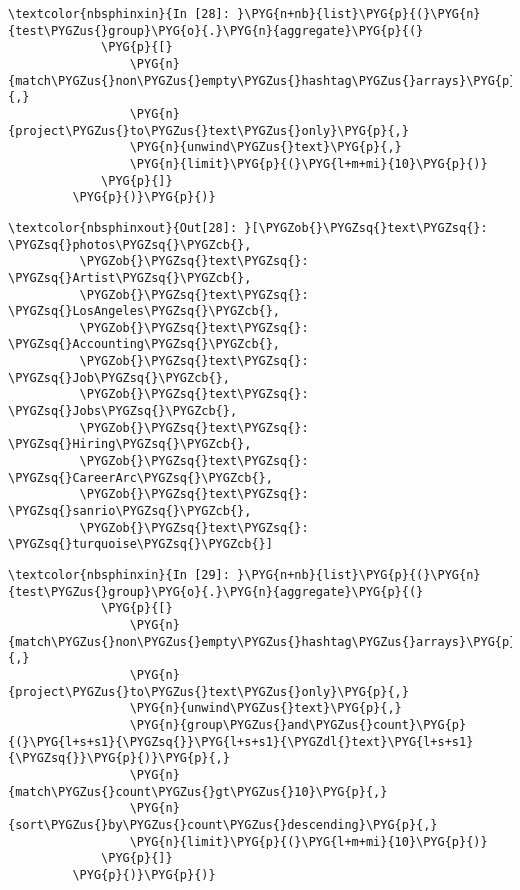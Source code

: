 \documentclass[letterpaper,10pt,english]{sphinxmanual}
\begin{document}
%
\begin{Verbatim}[commandchars=\\\{\}]
\textcolor{nbsphinxin}{In [28]: }\PYG{n+nb}{list}\PYG{p}{(}\PYG{n}{test\PYGZus{}group}\PYG{o}{.}\PYG{n}{aggregate}\PYG{p}{(}
             \PYG{p}{[}
                 \PYG{n}{match\PYGZus{}non\PYGZus{}empty\PYGZus{}hashtag\PYGZus{}arrays}\PYG{p}{,}
                 \PYG{n}{project\PYGZus{}to\PYGZus{}text\PYGZus{}only}\PYG{p}{,}
                 \PYG{n}{unwind\PYGZus{}text}\PYG{p}{,}
                 \PYG{n}{limit}\PYG{p}{(}\PYG{l+m+mi}{10}\PYG{p}{)}
             \PYG{p}{]}
         \PYG{p}{)}\PYG{p}{)}
\end{Verbatim}

%
\begin{Verbatim}[commandchars=\\\{\}]
\textcolor{nbsphinxout}{Out[28]: }[\PYGZob{}\PYGZsq{}text\PYGZsq{}: \PYGZsq{}photos\PYGZsq{}\PYGZcb{},
          \PYGZob{}\PYGZsq{}text\PYGZsq{}: \PYGZsq{}Artist\PYGZsq{}\PYGZcb{},
          \PYGZob{}\PYGZsq{}text\PYGZsq{}: \PYGZsq{}LosAngeles\PYGZsq{}\PYGZcb{},
          \PYGZob{}\PYGZsq{}text\PYGZsq{}: \PYGZsq{}Accounting\PYGZsq{}\PYGZcb{},
          \PYGZob{}\PYGZsq{}text\PYGZsq{}: \PYGZsq{}Job\PYGZsq{}\PYGZcb{},
          \PYGZob{}\PYGZsq{}text\PYGZsq{}: \PYGZsq{}Jobs\PYGZsq{}\PYGZcb{},
          \PYGZob{}\PYGZsq{}text\PYGZsq{}: \PYGZsq{}Hiring\PYGZsq{}\PYGZcb{},
          \PYGZob{}\PYGZsq{}text\PYGZsq{}: \PYGZsq{}CareerArc\PYGZsq{}\PYGZcb{},
          \PYGZob{}\PYGZsq{}text\PYGZsq{}: \PYGZsq{}sanrio\PYGZsq{}\PYGZcb{},
          \PYGZob{}\PYGZsq{}text\PYGZsq{}: \PYGZsq{}turquoise\PYGZsq{}\PYGZcb{}]
\end{Verbatim}

%
\begin{Verbatim}[commandchars=\\\{\}]
\textcolor{nbsphinxin}{In [29]: }\PYG{n+nb}{list}\PYG{p}{(}\PYG{n}{test\PYGZus{}group}\PYG{o}{.}\PYG{n}{aggregate}\PYG{p}{(}
             \PYG{p}{[}
                 \PYG{n}{match\PYGZus{}non\PYGZus{}empty\PYGZus{}hashtag\PYGZus{}arrays}\PYG{p}{,}
                 \PYG{n}{project\PYGZus{}to\PYGZus{}text\PYGZus{}only}\PYG{p}{,}
                 \PYG{n}{unwind\PYGZus{}text}\PYG{p}{,}
                 \PYG{n}{group\PYGZus{}and\PYGZus{}count}\PYG{p}{(}\PYG{l+s+s1}{\PYGZsq{}}\PYG{l+s+s1}{\PYGZdl{}text}\PYG{l+s+s1}{\PYGZsq{}}\PYG{p}{)}\PYG{p}{,}
                 \PYG{n}{match\PYGZus{}count\PYGZus{}gt\PYGZus{}10}\PYG{p}{,}
                 \PYG{n}{sort\PYGZus{}by\PYGZus{}count\PYGZus{}descending}\PYG{p}{,}
                 \PYG{n}{limit}\PYG{p}{(}\PYG{l+m+mi}{10}\PYG{p}{)}
             \PYG{p}{]}
         \PYG{p}{)}\PYG{p}{)}
\end{Verbatim}
\end{document}
